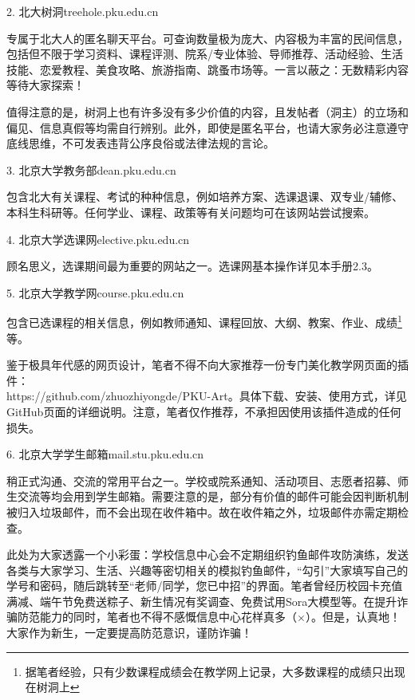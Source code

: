 \documentclass[11pt,oneside]{book}
\begin{document}
2. 北大树洞\quad treehole.pku.edu.cn

专属于北大人的匿名聊天平台。可查询数量极为庞大、内容极为丰富的民间信息，包括但不限于学习资料、课程评测、院系/专业体验、导师推荐、活动经验、生活技能、恋爱教程、美食攻略、旅游指南、跳蚤市场等。一言以蔽之：无数精彩内容等待大家探索！

值得注意的是，树洞上也有许多没有多少价值的内容，且发帖者（洞主）的立场和偏见、信息真假等均需自行辨别。此外，即使是匿名平台，也请大家务必注意遵守底线思维，不可发表违背公序良俗或法律法规的言论。

\vspace{10pt}

3. 北京大学教务部\quad dean.pku.edu.cn

包含北大有关课程、考试的种种信息，例如培养方案、选课退课、双专业/辅修、本科生科研等。任何学业、课程、政策等有关问题均可在该网站尝试搜索。

\vspace{10pt}

4. 北京大学选课网\quad elective.pku.edu.cn

顾名思义，选课期间最为重要的网站之一。选课网基本操作详见本手册2.3。

\vspace{10pt}

5. 北京大学教学网\quad course.pku.edu.cn

包含已选课程的相关信息，例如教师通知、课程回放、大纲、教案、作业、成绩\footnote{据笔者经验，只有少数课程成绩会在教学网上记录，大多数课程的成绩只出现在树洞上}等。

鉴于极具年代感的网页设计，笔者不得不向大家推荐一份专门美化教学网页面的插件：\\https://github.com/zhuozhiyongde/PKU-Art。具体下载、安装、使用方式，详见GitHub页面的详细说明。注意，笔者仅作推荐，不承担因使用该插件造成的任何损失。

\vspace{10pt}

6. 北京大学学生邮箱\quad mail.stu.pku.edu.cn 

稍正式沟通、交流的常用平台之一。学校或院系通知、活动项目、志愿者招募、师生交流等均会用到学生邮箱。需要注意的是，部分有价值的邮件可能会因判断机制被归入垃圾邮件，而不会出现在收件箱中。故在收件箱之外，垃圾邮件亦需定期检查。

此处为大家透露一个小彩蛋：学校信息中心会不定期组织钓鱼邮件攻防演练，发送各类与大家学习、生活、兴趣等密切相关的模拟钓鱼邮件，“勾引”大家填写自己的学号和密码，随后跳转至“老师/同学，您已中招”的界面。笔者曾经历校园卡充值满减、端午节免费送粽子、新生情况有奖调查、免费试用Sora大模型等。在提升诈骗防范能力的同时，笔者也不得不感慨信息中心花样真多（$\times$）。但是，认真地！大家作为新生，一定要提高防范意识，谨防诈骗！
\end{document}
